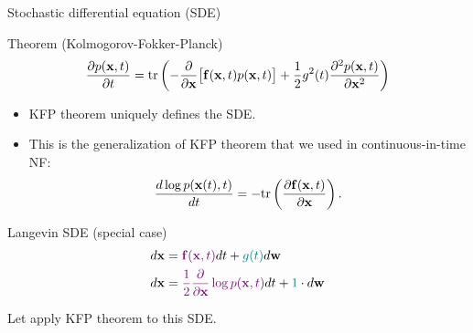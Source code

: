 \begin{frame}{Stochastic differential equation (SDE)}
 	\begin{block}{Theorem (Kolmogorov-Fokker-Planck)}
 		\vspace{-0.2cm}
 		\[
 			\frac{\partial p(\mathbf{x}, t)}{\partial t} = \text{tr}\left(- \frac{\partial}{\partial \mathbf{x}} \bigl[ \mathbf{f}(\mathbf{x}, t) p(\mathbf{x}, t)\bigr] + \frac{1}{2} g^2(t) \frac{\partial^2 p(\mathbf{x}, t)}{\partial \mathbf{x}^2} \right)
 		\]
 	\end{block}
 	 \begin{itemize}
 	 	\item KFP theorem uniquely defines the SDE.
 		 \item This is the generalization of KFP theorem that we used in continuous-in-time NF:
 	 	\[
 	 		\frac{d \log p(\mathbf{x}(t), t)}{d t} = - \text{tr} \left( \frac{\partial \mathbf{f}(\mathbf{x}, t)}{\partial \mathbf{x}} \right).
 	 	\]
 	 \end{itemize}
	\vspace{-0.3cm}
 	\begin{block}{Langevin SDE (special case)}
 		\vspace{-0.6cm}
 		\begin{align*}
 			d\mathbf{x} &= {\color{violet}\mathbf{f}(\mathbf{x}, t)} dt + {\color{teal}g(t)} d \mathbf{w} \\
 			d \mathbf{x} &= {\color{violet}\frac{1}{2} \frac{\partial}{\partial \mathbf{x}} \log p(\mathbf{x}, t)} d t + {\color{teal} 1 } \cdot d \mathbf{w}
 		\end{align*}
 		\vspace{-0.3cm}
 	\end{block}
 	Let apply KFP theorem to this SDE.
\end{frame}
